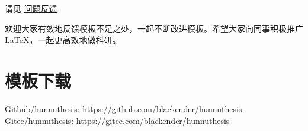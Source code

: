 请见 \href{https://github.com/blackender/hunnuthesis/wiki/%E5%B8%B8%E8%A7%81%E9%97%AE%E9%A2%98}{问题反馈} 

欢迎大家有效地反馈模板不足之处，一起不断改进模板。希望大家向同事积极推广\LaTeX{}，一起更高效地做科研。

\section{模板下载}

\begin{center}
    \href{https://github.com/blackender/hunnuthesis}{Github/hunnuthesis}: \url{https://github.com/blackender/hunnuthesis}\\
    \href{https://gitee.com/blackender/hunnuthesis}{Gitee/hunnuthesis}: \url{https://gitee.com/blackender/hunnuthesis}
\end{center}


